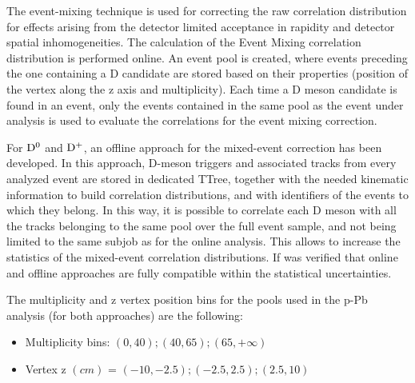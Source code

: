 \label{MEsection}
The event-mixing technique is used for correcting the raw correlation distribution for effects arising
from the detector limited acceptance in rapidity and detector spatial inhomogeneities. The calculation of the Event
Mixing correlation distribution is performed online. %
An event pool is created, where events preceding the one containing a D candidate are stored based on their properties (position of the vertex along the z axis and multiplicity).
Each time a D meson candidate is found in an event, only the events contained in the same pool as the event under analysis is used to evaluate the correlations for the event mixing correction.%

For ${\rm D^0}$ and ${\rm D^+}$, an offline approach for the mixed-event correction has been developed. In this approach, D-meson triggers and associated tracks from every analyzed event are stored in dedicated TTree, together with the needed kinematic information to build correlation distributions, and with identifiers of the events to which they belong. In this way, it is possible to correlate each D meson with all the tracks belonging to the same pool over the full event sample, and not being limited to the same subjob as for the online analysis. This allows to increase the statistics of the mixed-event correlation distributions. If was verified that online and offline approaches are fully compatible within the statistical uncertainties.

The multiplicity and z vertex position bins for the pools used in the p-Pb analysis (for both approaches) are the following:
\begin{itemize}
\item Multiplicity bins: $\left(0,40\right);\left(40,65\right);\left(65,+\infty\right)$
\item Vertex z $(cm)$ = $\left(-10,-2.5\right);\left(-2.5,2.5\right);\left(2.5,10\right)$
\end{itemize}

